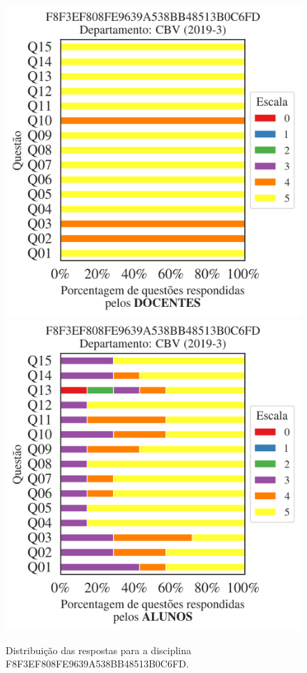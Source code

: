 \documentclass[a4paper,10pt]{article}
\begin{document}
\begin{figure}[h]
\centering
\includegraphics[width=0.485\linewidth]{analise_disciplina_departamento_CBV_F8F3EF808FE9639A538BB48513B0C6FD_docentes.png}
\includegraphics[width=0.485\linewidth]{analise_disciplina_departamento_CBV_F8F3EF808FE9639A538BB48513B0C6FD_alunos.png}
\caption{\label{fig:analise_geral_departamento}                Distribuição das respostas para a disciplina F8F3EF808FE9639A538BB48513B0C6FD. }
\end{figure}
\end{document}
